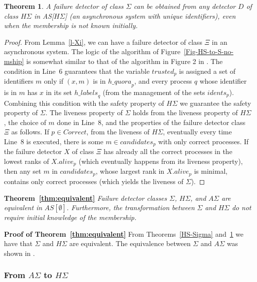 \documentclass[10pt, conference, compsocconf]{IEEEtran}
\newtheorem{theorem}{Theorem}
\newcommand{\tightparagraph}[1]{\smallskip \noindent \textbf{#1} \hspace{1ex}}
\newcommand{\HS}{{H\Sigma}}
\newcommand{\AS}{{A\Sigma}}
\newcommand{\C}{{\mathit{Correct}}}
\newcommand{\quora}{{\mathit{h\_quora}}}
\newcommand{\labels}{{\mathit{h\_labels}}}
\begin{document}
\begin{theorem}
\label{Sigma-HS}
A failure detector of class $\Sigma$ can be obtained from any detector $D$ of class $\HS$ in AS[$\HS$] (an asynchronous system with unique identifiers), even when the membership is not known initially.
\end{theorem}
\begin{proof}
From Lemma~\ref{l-Xi}, we can have a failure detector of class $\Xi$ in an asynchronous system. The logic of the algorithm of Figure~\ref{Fig-HS-to-S-no-mship} is somewhat similar to that of the algorithm in Figure 2 in \cite{DBLP:conf/wdag/BonnetR10}. The condition in Line~6 guarantees that the variable $trusted _p$ is assigned a set of identifiers $m$ only if $(x,m)$ is in $\quora_p$, and every process $q$ whose identifier is in $m$ has $x$ in its set $\labels_q$ (from the management of the sets $idents_p$). Combining this condition with the safety property of $\HS$ we guarantee the safety property of $\Sigma$. The liveness property of $\Sigma$ holds from the liveness property of $\HS$, the choice of $m$ done in Line~8, and the properties of the failure detector class $\Xi$ as follows. If $p \in \C$, from the liveness of $\HS$, eventually every time Line~8 is executed, there is some $m \in candidates_p$ with only correct processes. If the failure detector $X$ of class $\Xi$ has already
all the correct processes in the lowest ranks of $X.alive_p$ (which eventually happens from its liveness property), then any set $m$ in $candidates_p$, whose largest rank in $X.alive_p$ is minimal, contains only correct processes (which yields the liveness of $\Sigma$).
\end{proof}


\tightparagraph{Theorem~\ref{thm:equivalent}}
\emph{Failure detector classes $\Sigma$, $\HS$, and $\AS$ are equivalent in $AS[\emptyset]$. Furthermore,
the transformation between $\Sigma$ and $\HS$ do not require initial knowledge of the membership.}

\tightparagraph{Proof of Theorem~\ref{thm:equivalent}}
From Theorems~\ref{HS-Sigma} and~\ref{Sigma-HS} we have that $\Sigma$ and $\HS$ are equivalent.  The equivalence between $\Sigma$ and $\AS$ was shown in \cite{DBLP:conf/wdag/BonnetR10}. 







\subsubsection{From $\AS$ to $\HS$}
\end{document}
